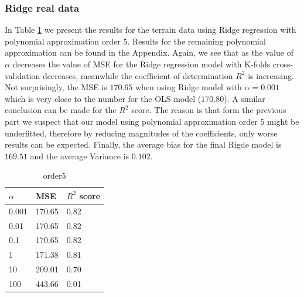 \documentclass [11pt]{article}
\begin{document}
\subsubsection{Ridge real data}
In Table \ref{tab:ridge5Terrain} we present the results for the terrain data using Ridge regression with polynomial approximation order $5$. Results for the remaining polynomial approximation can be found in the Appendix. Again, we see that as the value of $\alpha$ decreases the value of MSE for the Ridge regression model with K-folds cross-validation decreases, meanwhile the coefficient of determination $R^{2}$ is increasing.\\
Not surprisingly, the MSE is $170.65$ when using Ridge model with $\alpha=0.001$ which is very close to the number for the OLS model ($170.80$). A similar conclusion can be made for the $R^{2}$ score. The reason is that form the previous part we suspect that our model using polynomial approximation order $5$ might be underfitted, therefore by reducing magnitudes of the coefficients, only worse  results can be expected. Finally, the average bias for the final Rigde model is $169.51$ and the average Variance is $0.102$.


\begin{table}[H]
\centering
\begin{tabular}{lll}
\hline
$\alpha$ & MSE    & $R^{2}$ score \\ \hline
0.001     & 170.65 & 0.82          \\
0.01      & 170.65 & 0.82          \\
0.1       & 170.65 & 0.82         \\
1         & 171.38 & 0.81          \\
10        & 209.01 & 0.70          \\
100       & 443.66 & 0.01          \\ \hline
\end{tabular}
\caption{order5}
\label{tab:ridge5Terrain}
\end{table}
\end{document}
